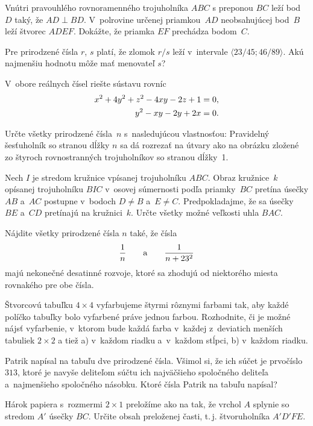 {%
Vnútri pravouhlého rovnoramenného trojuholníka $ABC$ s preponou $BC$ leží bod~$D$ taký, že $AD \perp BD$. V~polrovine určenej priamkou~$AD$ neobsahujúcej bod~$B$ leží štvorec $ADEF$. Dokážte, že priamka $EF$ prechádza bodom~$C$.
}

{%
Pre prirodzené čísla $r$, $s$ platí, že zlomok $r/s$ leží v~intervale $\langle23/45;46/89\rangle$. Akú najmenšiu hodnotu môže mať menovateľ $s$?
}

{%
V~obore reálnych čísel riešte sústavu rovníc
$$
\aligned
 x^2+4y^2+z^2-4xy-2z+1&=0,\\
 y^2-xy-2y+2x&=0.
\endaligned
$$
}

{%
Určte všetky prirodzené čísla~$n$ s~nasledujúcou vlastnosťou: Pravidelný šesťuholník so stranou dĺžky $n$ sa dá rozrezať na útvary ako na obrázku zložené zo štyroch rovnostranných trojuholníkov so stranou dĺžky~1.
%
}

{%
Nech $I$ je stredom kružnice vpísanej trojuholníku $ABC$. Obraz kružnice~$k$ opísanej trojuholníku $BIC$ v~osovej súmernosti podľa priamky~$BC$ pretína úsečky $AB$ a~$AC$ postupne v~bodoch $D\ne B$ a~$E\ne C$. Predpokladajme, že sa úsečky $BE$ a~$CD$ pretínajú na kružnici~$k$. Určte všetky možné veľkosti uhla $BAC$.
}

{%
Nájdite všetky prirodzené čísla $n$ také, že čísla
$$
\frac1n\qquad \hbox{a}\qquad \frac1{n+23^2}
$$
majú nekonečné desatinné rozvoje, ktoré sa zhodujú od niektorého miesta rovnakého pre obe čísla.
}

{%
Štvorcovú tabuľku $4\times 4$ vyfarbujeme štyrmi rôznymi farbami tak, aby každé políčko tabuľky bolo vyfarbené práve jednou farbou. Rozhodnite, či je možné nájsť vyfarbenie, v~ktorom bude každá farba v~každej z~deviatich menších tabuliek $2\times2$ a tiež
\ite a) v~každom riadku a~v~každom stĺpci,
\ite b) v~každom riadku.
}

{%
Patrik napísal na tabuľu dve prirodzené čísla. Všimol si, že ich súčet je prvočíslo~$313$, ktoré je navyše deliteľom súčtu ich najväčšieho spoločného deliteľa a~najmenšieho spoločného násobku. Ktoré čísla Patrik na tabuľu napísal?
}

{%
Hárok papiera s~rozmermi $2\times 1$ preložíme ako na \obr{} tak, že vrchol $A$ splynie so stredom $A'$ úsečky $BC$. Určite obsah preloženej časti, t.\,j. štvoruholníka $A'D'FE$.
%
}

